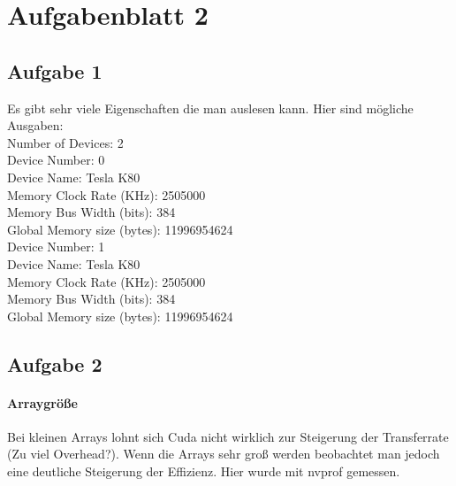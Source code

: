 \documentclass{article}
\begin{document}
\newpage

\section{Aufgabenblatt 2}

\subsection{Aufgabe 1}

Es gibt sehr viele Eigenschaften die man auslesen kann. Hier sind mögliche Ausgaben: \\

Number of Devices: 2\\
Device Number:                0\\
Device Name:                  Tesla K80\\
Memory Clock Rate (KHz):      2505000\\
Memory Bus Width (bits):      384\\
Global Memory size (bytes):   11996954624\\
Device Number:                1\\
Device Name:                  Tesla K80\\
Memory Clock Rate (KHz):      2505000\\
Memory Bus Width (bits):      384\\
Global Memory size (bytes):   11996954624\\

\subsection{Aufgabe 2}

\paragraph{Arraygröße} Bei kleinen Arrays lohnt sich Cuda nicht wirklich zur Steigerung der Transferrate (Zu viel Overhead?).
Wenn die Arrays sehr groß werden beobachtet man jedoch eine deutliche Steigerung der Effizienz.
Hier wurde mit nvprof gemessen.
\end{document}
